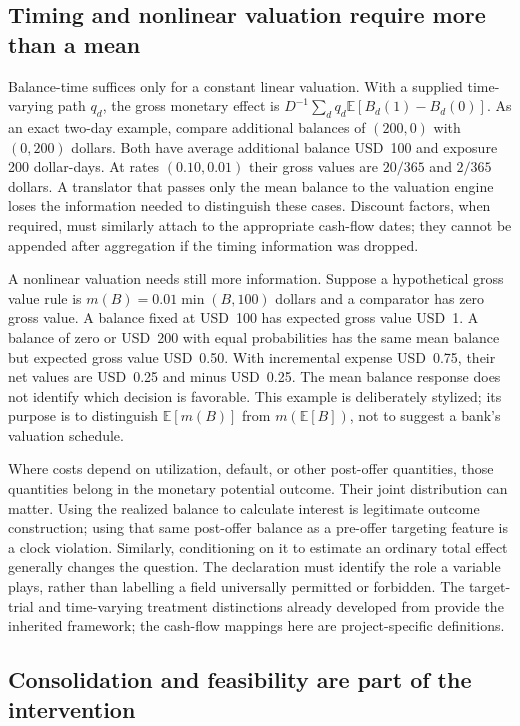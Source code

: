 \subsection{Timing and nonlinear valuation require more than a mean}

Balance-time suffices only for a constant linear valuation. With a supplied
time-varying path $q_d$, the gross monetary effect is
$D^{-1}\sum_d q_d\mathbb E[B_d(1)-B_d(0)]$. As an exact two-day example,
compare additional balances of $(200,0)$ with $(0,200)$ dollars. Both have
average additional balance USD~100 and exposure 200 dollar-days. At rates
$(0.10,0.01)$ their gross values are $20/365$ and $2/365$ dollars. A translator
that passes only the mean balance to the valuation engine loses the
information needed to distinguish these cases. Discount factors, when
required, must similarly attach to the appropriate cash-flow dates; they
cannot be appended after aggregation if the timing information was dropped.

A nonlinear valuation needs still more information. Suppose a hypothetical
gross value rule is $m(B)=0.01\min(B,100)$ dollars and a comparator has zero
gross value. A balance fixed at USD~100 has expected gross value USD~1.
A balance of zero or USD~200 with equal probabilities has the same mean
balance but expected gross value USD~0.50. With incremental expense USD~0.75,
their net values are USD~0.25 and minus USD~0.25. The mean balance response
does not identify which decision is favorable. This example is deliberately
stylized; its purpose is to distinguish $\mathbb E[m(B)]$ from
$m(\mathbb E[B])$, not to suggest a bank's valuation schedule.

Where costs depend on utilization, default, or other post-offer quantities,
those quantities belong in the monetary potential outcome. Their joint
distribution can matter. Using the realized balance to calculate interest
is legitimate outcome construction; using that same post-offer balance as
a pre-offer targeting feature is a clock violation. Similarly, conditioning
on it to estimate an ordinary total effect generally changes the question.
The declaration must identify the role a variable plays, rather than
labelling a field universally permitted or forbidden. The target-trial and
time-varying treatment distinctions already developed from
\citet{hernan2020} provide the inherited framework; the cash-flow mappings
here are project-specific definitions.

\subsection{Consolidation and feasibility are part of the intervention}

